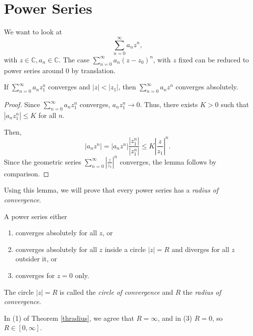 \section{Power Series}
We want to look at
\[
    \sum\limits_{n=0}^{\infty} a_n z^n,
\]
with \(z \in \mathbb{C}, a_n \in \mathbb{C}\). The case \(\sum\limits_{n=0}^{\infty} a_n (z - z_0)^n\), with \(z\) fixed can be reduced to power series around 0 by translation.
\begin{lemma}
    \label{smallerrad}
    If \(\sum\limits_{n=0}^{\infty} a_n z_1^n\) converges and \(\left\vert z \right\vert < \left\vert z_1 \right\vert\), then \(\sum\limits_{n=0}^{\infty} a_n z^n\) converges absolutely.
\end{lemma}
\begin{proof}
    Since \(\sum\limits_{n=0}^{\infty} a_n z_1^n\) converges, \(a_n z_1^n \to 0\). Thus, there exists \( K > 0\) such that \(\left\vert a_n z_1^n \right\vert \leq K\) for all \(n\).

    Then,
    \[
        \left\vert a_n z^n \right\vert = \left\vert a_n z^n \right\vert \frac{\left\vert z_1^n \right\vert}{\left\vert z_1^n \right\vert} \leq K \left\vert \frac{z}{z_1} \right\vert^n.
    \]
    Since the geometric series \(\sum\limits_{n=0}^{\infty} \left\vert \frac{z}{z_1} \right\vert^n \) converges, the lemma follows by comparison.
\end{proof}
Using this lemma, we will prove that every power series has a \textit{radius of convergence}.
\begin{theorem}
    \label{thradius}
    A power series either
    \begin{enumerate}
        \item converges absolutely for all \(z\), or
        \item converges absolutely for all \(z\) inside a circle \(\left\vert z \right\vert = R\) and diverges for all \(z\) outsider it, or
        \item converges for \(z = 0\) only.
    \end{enumerate}
\end{theorem}
\begin{definition}
    The circle \(\left\vert z \right\vert = R\) is called the \textit{circle of convergence} and \(R\) the \textit{radius of convergence}.

    In (1) of Theorem \eqref{thradius}, we agree that \(R = \infty\), and in (3) \(R = 0\), so \(R \in [0, \infty]\).
\end{definition}
